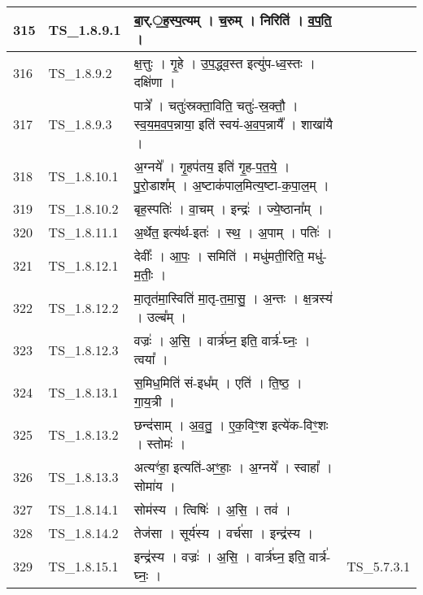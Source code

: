 \documentclass[17pt]{extarticle}
\begin{document}
\begin{longtable}{||p{0.4in}||p{0.9in}||p{4.0in}||p{0.9in}||}
        \hline
            315 & TS\_1.8.9.1 & बा॒र्.॒ह॒स्प॒त्यम्   ।   च॒रुम्   ।   निरिति॑   ।   व॒प॒ति॒   ।    &      \\
        \hline
            316 & TS\_1.8.9.2 & क्ष॒त्तुः   ।   गृ॒हे   ।   उ॒प॒द्ध्व॒स्त इत्यु॑प{-}ध्व॒स्तः   ।   दक्षि॑णा   ।    &      \\
        \hline
            317 & TS\_1.8.9.3 & पात्रे᳚   ।   चतुः॑स्रक्ता॒विति॒ चतुः॑{-}स्र॒क्तौ॒   ।   स्व॒य॒म॒व॒प॒न्नाया॒ इति॑ स्वयं{-}अ॒व॒प॒न्नायै᳚   ।   शाखा॑यै   ।    &      \\
        \hline
            318 & TS\_1.8.10.1 & अ॒ग्नये᳚   ।   गृ॒हप॑तय॒ इति॑ गृ॒ह{-}प॒त॒ये॒   ।   पु॒रो॒डाश᳚म्   ।   अ॒ष्टाक॑पाल॒मित्य॒ष्टा{-}क॒पा॒ल॒म्   ।    &      \\
        \hline
            319 & TS\_1.8.10.2 & बृह॒स्पतिः॑   ।   वा॒चम्   ।   इन्द्रः॑   ।   ज्ये॒ष्ठाना᳚म्   ।    &      \\
        \hline
            320 & TS\_1.8.11.1 & अ॒र्थेत॒ इत्य॑र्थ{-}इतः॑   ।   स्थ॒   ।   अ॒पाम्   ।   पतिः॑   ।    &      \\
        \hline
            321 & TS\_1.8.12.1 & देवीः᳚   ।   आ॒पः॒   ।   समिति॑   ।   मधु॑मती॒रिति॒ मधु॑{-} म॒तीः॒   ।    &      \\
        \hline
            322 & TS\_1.8.12.2 & मा॒तृत॑मा॒स्विति॑ मा॒तृ{-}त॒मा॒सु॒   ।   अ॒न्तः   ।   क्ष॒त्रस्य॑   ।   उल्ब᳚म्   ।    &      \\
        \hline
            323 & TS\_1.8.12.3 & वज्रः॑   ।   अ॒सि॒   ।   वार्त्र॑घ्न॒ इति॒ वार्त्र॑{-}घ्नः॒   ।   त्वया᳚   ।    &      \\
        \hline
            324 & TS\_1.8.13.1 & स॒मिध॒मिति॑ सं{-}इध᳚म्   ।   एति॑   ।   ति॒ष्ठ॒   ।   गा॒य॒त्री   ।    &      \\
        \hline
            325 & TS\_1.8.13.2 & छन्द॑साम्   ।   अ॒व॒तु॒   ।   ए॒क॒विꣳ॒॒श इत्ये॑क{-}विꣳ॒॒शः   ।   स्तोमः॑   ।    &      \\
        \hline
            326 & TS\_1.8.13.3 & अत्यꣳ॑हा॒ इत्यति॑{-}अꣳ॒॒हाः॒   ।   अ॒ग्नये᳚   ।   स्वाहा᳚   ।   सोमा॑य   ।    &      \\
        \hline
            327 & TS\_1.8.14.1 & सोम॑स्य   ।   त्विषिः॑   ।   अ॒सि॒   ।   तव॑   ।    &      \\
        \hline
            328 & TS\_1.8.14.2 & तेज॑सा   ।   सूर्य॑स्य   ।   वर्च॑सा   ।   इन्द्र॑स्य   ।    &      \\
        \hline
            329 & TS\_1.8.15.1 & इन्द्र॑स्य   ।   वज्रः॑   ।   अ॒सि॒   ।   वार्त्र॑घ्न॒ इति॒ वार्त्र॑{-}घ्नः॒   ।    &  TS\_5.7.3.1       \\

\end{longtable}
\end{document}
